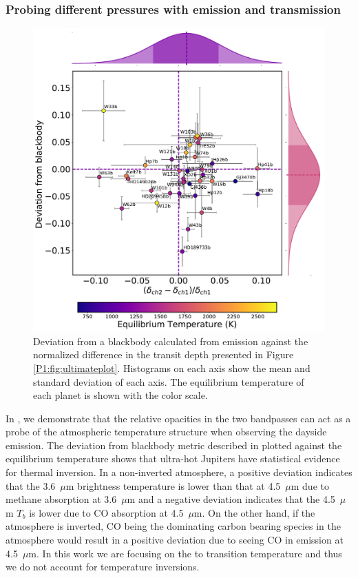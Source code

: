 \subsubsection{Probing different pressures with emission and transmission}
\begin{figure}
    \centering
    \includegraphics[width = \linewidth]{TvsE+hist+emily.pdf}
    \caption{Deviation from a blackbody calculated from emission against the normalized difference in the transit depth presented in Figure \ref{P1:fig:ultimateplot}. Histograms on each axis show the mean and standard deviation of each axis. The equilibrium temperature of each planet is shown with the color scale.}
    \label{P1:fig:TvsE}
\end{figure}

In \citet{Baxter2020}, we demonstrate that the relative opacities in the two \spitzerIRAC bandpasses can act as a probe of the atmospheric temperature structure when observing the dayside emission. The deviation from blackbody metric described in \citet{Baxter2020} plotted against the equilibrium temperature shows that ultra-hot Jupiters have statistical evidence for thermal inversion. In a non-inverted atmosphere, a positive deviation indicates that the 3.6~$\mu$m brightness temperature is lower than that at 4.5~$\mu$m due to methane absorption at 3.6~$\mu$m and a negative deviation indicates that the 4.5~$\mu$m $T_b$ is lower due to CO absorption at 4.5~$\mu$m. On the other hand, if the atmosphere is inverted, CO being the dominating carbon bearing species in the atmosphere would result in a positive deviation due to seeing CO in emission at 4.5~$\mu$m. In this work we are focusing on the  to  transition temperature and thus we do not account for temperature inversions.

